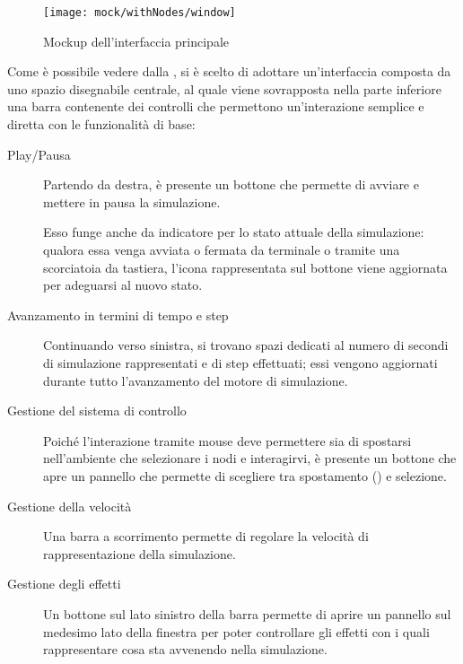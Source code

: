         \begin{figure}[htbp]
            \centering
            \texttt{[image: mock/withNodes/window]}
            \caption{Mockup dell'interfaccia principale}
            \label{fig:mock:mainWindow}
        \end{figure}

        Come è possibile vedere dalla , si è scelto di adottare un'interfaccia composta da uno spazio disegnabile centrale, al quale viene sovrapposta nella parte inferiore una barra contenente dei controlli che permettono un'interazione semplice e diretta con le funzionalità di base:

        \begin{description}
            \item [Play/Pausa]
                Partendo da destra, è presente un bottone che permette di avviare e mettere in pausa la simulazione.

                Esso funge anche da indicatore per lo stato attuale della simulazione:
                qualora essa venga avviata o fermata da terminale o tramite una scorciatoia da tastiera, l'icona rappresentata sul bottone viene aggiornata per adeguarsi al nuovo stato.

            \item[Avanzamento in termini di tempo e step]
                Continuando verso sinistra, si trovano spazi dedicati al numero di secondi di simulazione rappresentati e di step effettuati;
                essi vengono aggiornati durante tutto l'avanzamento del motore di simulazione.

            \item[Gestione del sistema di controllo]
                Poiché l'interazione tramite mouse deve permettere sia di spostarsi nell'ambiente che selezionare i nodi e interagirvi, è presente un bottone che apre un pannello che permette di scegliere tra spostamento () e selezione.

            \item[Gestione della velocità]
                Una barra a scorrimento permette di regolare la velocità di rappresentazione della simulazione.

            \item[Gestione degli effetti]
                Un bottone sul lato sinistro della barra permette di aprire un pannello sul medesimo lato della finestra per poter controllare gli effetti con i quali rappresentare cosa sta avvenendo nella simulazione.


\end{description}
